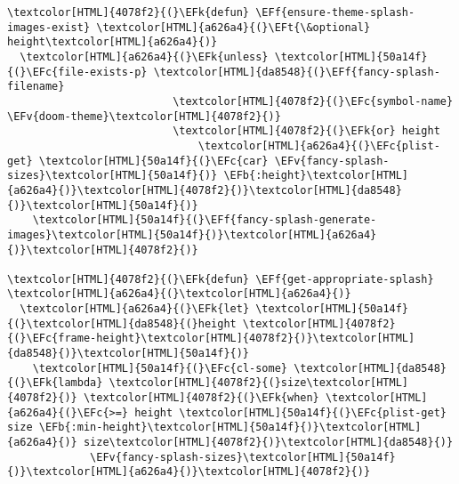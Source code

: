 \documentclass{scrartcl}
\newcommand{\EFk}[1]{\textcolor{EFk}{#1}} %
\newcommand{\EFt}[1]{\textcolor{EFt}{#1}} %
\newcommand{\EFb}[1]{\textcolor{EFb}{#1}} %
\newcommand{\EFc}[1]{\textcolor{EFc}{#1}} %
\newcommand{\EFv}[1]{\textcolor{EFv}{#1}} %
\newcommand{\EFf}[1]{\textcolor{EFf}{#1}} %
\begin{document}
\begin{Code}
\begin{Verbatim}[]
\textcolor[HTML]{4078f2}{(}\EFk{defun} \EFf{ensure-theme-splash-images-exist} \textcolor[HTML]{a626a4}{(}\EFt{\&optional} height\textcolor[HTML]{a626a4}{)}
  \textcolor[HTML]{a626a4}{(}\EFk{unless} \textcolor[HTML]{50a14f}{(}\EFc{file-exists-p} \textcolor[HTML]{da8548}{(}\EFf{fancy-splash-filename}
                          \textcolor[HTML]{4078f2}{(}\EFc{symbol-name} \EFv{doom-theme}\textcolor[HTML]{4078f2}{)}
                          \textcolor[HTML]{4078f2}{(}\EFk{or} height
                              \textcolor[HTML]{a626a4}{(}\EFc{plist-get} \textcolor[HTML]{50a14f}{(}\EFc{car} \EFv{fancy-splash-sizes}\textcolor[HTML]{50a14f}{)} \EFb{:height}\textcolor[HTML]{a626a4}{)}\textcolor[HTML]{4078f2}{)}\textcolor[HTML]{da8548}{)}\textcolor[HTML]{50a14f}{)}
    \textcolor[HTML]{50a14f}{(}\EFf{fancy-splash-generate-images}\textcolor[HTML]{50a14f}{)}\textcolor[HTML]{a626a4}{)}\textcolor[HTML]{4078f2}{)}

\textcolor[HTML]{4078f2}{(}\EFk{defun} \EFf{get-appropriate-splash} \textcolor[HTML]{a626a4}{(}\textcolor[HTML]{a626a4}{)}
  \textcolor[HTML]{a626a4}{(}\EFk{let} \textcolor[HTML]{50a14f}{(}\textcolor[HTML]{da8548}{(}height \textcolor[HTML]{4078f2}{(}\EFc{frame-height}\textcolor[HTML]{4078f2}{)}\textcolor[HTML]{da8548}{)}\textcolor[HTML]{50a14f}{)}
    \textcolor[HTML]{50a14f}{(}\EFc{cl-some} \textcolor[HTML]{da8548}{(}\EFk{lambda} \textcolor[HTML]{4078f2}{(}size\textcolor[HTML]{4078f2}{)} \textcolor[HTML]{4078f2}{(}\EFk{when} \textcolor[HTML]{a626a4}{(}\EFc{>=} height \textcolor[HTML]{50a14f}{(}\EFc{plist-get} size \EFb{:min-height}\textcolor[HTML]{50a14f}{)}\textcolor[HTML]{a626a4}{)} size\textcolor[HTML]{4078f2}{)}\textcolor[HTML]{da8548}{)}
             \EFv{fancy-splash-sizes}\textcolor[HTML]{50a14f}{)}\textcolor[HTML]{a626a4}{)}\textcolor[HTML]{4078f2}{)}


\end{Verbatim}
\end{Code}
\end{document}
